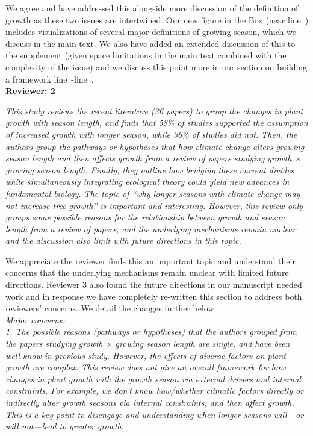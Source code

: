 \documentclass[11pt]{article}
\newcommand{\lr}[1]{line~\lineref{#1}}
\begin{document}
We agree and have addressed this alongside more discussion of the definition of growth as these two issues are intertwined. Our new figure in the Box (near \lr{startbox}) includes visualizations of several major definitions of growing season, which we discuss in the main text. We also have added an extended discussion of this to the supplement (given space limitations in the main text combined with the complexity of the issue) and we discuss this point more in our section on building a framework \lr{R1gslS}-\lr{R2complaint3E}.\\

{\bf Reviewer: 2}


\emph{This study reviews the recent literature (36 papers) to group the changes in plant growth with season length, and finds that 58\% of studies supported the assumption of increased growth with longer season, while 36\% of studies did not. Then, the authors group the pathways or hypotheses that how climate change alters growing season length and then affects growth from a review of papers studying growth × growing season length. Finally, they outline how bridging these current divides while simultaneously integrating ecological theory could yield new advances in fundamental biology. The topic of ``why longer seasons with climate change may not increase tree growth'' is important and interesting. However, this review only groups some possible reasons for the relationship between growth and season length from a review of papers, and the underlying mechanisms remain unclear and the discussion also limit with future directions in this topic.}

We appreciate the reviewer finds this an important topic and understand their concerns that the underlying mechanisms remain unclear with limited future directions. Reviewer 3 also found the future directions in our manuscript needed work and in response we have completely re-written this section to address both reviewers' concerns. We detail the changes further below. \\


\emph{Major concerns:}\\
\emph{1. The possible reasons (pathways or hypotheses) that the authors grouped from the papers studying growth × growing season length are single, and have been well-know in previous study. However, the effects of diverse factors on plant growth are complex. This review does not give an overall framework for how changes in plant growth with the growth season via external drivers and internal constraints. For example, we don’t know how/whether climatic factors directly or indirectly alter growth seasons via internal constraints, and then affect growth. This is a key point to disengage and understanding when longer seasons will---or will not---lead to greater growth.}
\end{document}
